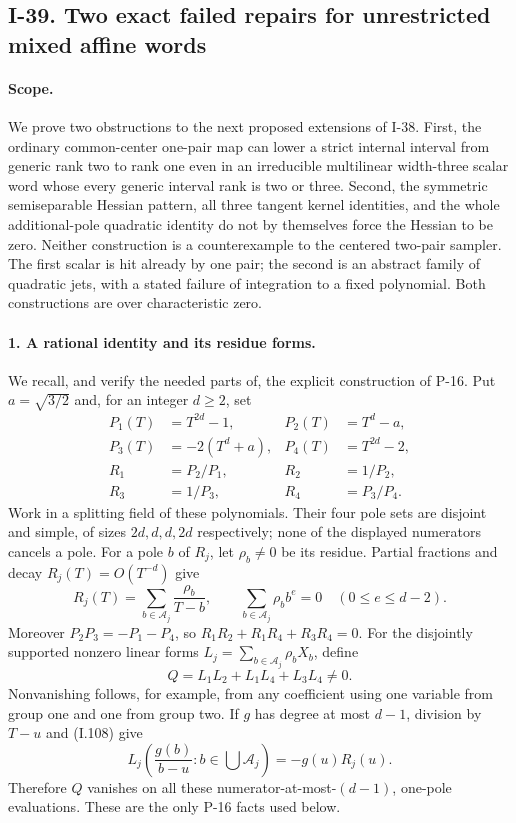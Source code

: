 \subsection{I-39. Two exact failed repairs for unrestricted mixed affine words}
\label{I-39}

\paragraph{Scope.}
We prove two obstructions to the next proposed extensions of I-38.
First, the ordinary common-center one-pair map can lower a strict
internal interval from generic rank two to rank one even in an
irreducible multilinear width-three scalar word whose every generic
interval rank is two or three. Second, the symmetric semiseparable
Hessian pattern, all three tangent kernel identities, and the whole
additional-pole quadratic identity do not by themselves force the
Hessian to be zero. Neither construction is a counterexample to
the centered two-pair sampler. The first scalar is hit already
by one pair; the second is an abstract family of quadratic jets,
with a stated failure of integration to a fixed polynomial.
Both constructions are over characteristic zero.

\paragraph{1. A rational identity and its residue forms.}
We recall, and verify the needed parts of, the explicit construction
of P-16. Put $a=\sqrt{3/2}$ and, for an integer $d\ge2$, set
\[
 \begin{aligned}
 P_1(T)&=T^{2d}-1,&P_2(T)&=T^d-a,\\
 P_3(T)&=-2(T^d+a),&P_4(T)&=T^{2d}-2,\\
 R_1&=P_2/P_1,&R_2&=1/P_2,\\
 R_3&=1/P_3,&R_4&=P_3/P_4.
 \end{aligned}
 \tag{I.107}
\]
Work in a splitting field of these polynomials. Their four pole
sets are disjoint and simple, of sizes $2d,d,d,2d$ respectively;
none of the displayed numerators cancels a pole. For a pole
$b$ of $R_j$, let $\rho_b\ne0$ be its residue. Partial fractions
and decay $R_j(T)=O(T^{-d})$ give
\[
 R_j(T)=\sum_{b\in\mathcal A_j}\frac{\rho_b}{T-b},
 \qquad \sum_{b\in\mathcal A_j}\rho_b b^e=0
                    \quad(0\le e\le d-2).
 \tag{I.108}
\]
Moreover $P_2P_3=-P_1-P_4$, so
$R_1R_2+R_1R_4+R_3R_4=0$.
For the disjointly supported nonzero linear forms
$L_j=\sum_{b\in\mathcal A_j}\rho_b X_b$, define
\[
 Q=L_1L_2+L_1L_4+L_3L_4\ne0.
 \tag{I.109}
\]
Nonvanishing follows, for example, from any coefficient using
one variable from group one and one from group two. If $g$ has
degree at most $d-1$, division by $T-u$ and (I.108) give
\[
 L_j\left(\frac{g(b)}{b-u}:b\in\bigcup\mathcal A_j\right)
 =-g(u)R_j(u).
 \tag{I.110}
\]
Therefore $Q$ vanishes on all these numerator-at-most-$(d-1)$,
one-pole evaluations. These are the only P-16 facts used below.

